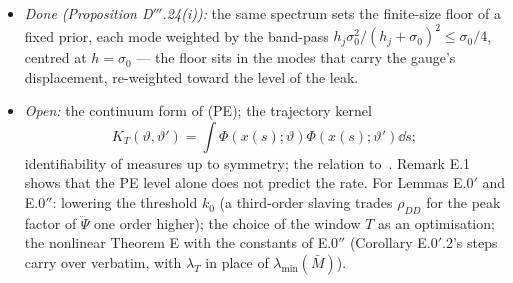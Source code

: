\begin{enumerate}[label=\arabic*.,leftmargin=*]
\begin{itemize}
      collective mode, and the leak's a-priori bound on the parameters (the leak toward an adaptive prior is an
      internal force, and the solutions can run off where no exact representation exists; projecting the prior onto a
      compact convex set restores the bound, Proposition D$'''$.27) --- the measure-space form of the classical
      trade-off between a leak's robustness and persistent excitation (an unexcited mode, $h_j = 0$, drifts with the
      prior).
    \item \emph{Done (Proposition D$'''$.24(i)):} the same spectrum sets the finite-size floor of a fixed prior, each
      mode weighted by the band-pass $h_j\sigma_0^2/(h_j + \sigma_0)^2\le\sigma_0/4$, centred at $h = \sigma_0$ --- the
      floor sits in the modes that carry the gauge's displacement, re-weighted toward the level of the leak.
    \item \emph{Open:} the continuum form of (PE); the trajectory kernel
      \[K_T(\vartheta,\vartheta')=\int\Phi(x(s);\vartheta)\Phi(x(s);\vartheta')\dd s;\]
      identifiability of measures up to symmetry; the relation to~\cite{R16}. Remark E.1 shows that the PE level
      alone does not predict the rate. For Lemmas E.0$'$ and E.0$''$: lowering the threshold $k_0$ (a third-order
      slaving trades $\rho_{DD}$ for the peak factor of $\dddot\Psi$ one order higher); the choice of the window $T$
      as an optimisation; the nonlinear Theorem E with the constants of E.0$''$ (Corollary E.0$'$.2's steps carry over
      verbatim, with $\lambda_T$ in place of $\lambda_{\min}(\bar M)$).
  \end{itemize}


\end{enumerate}
